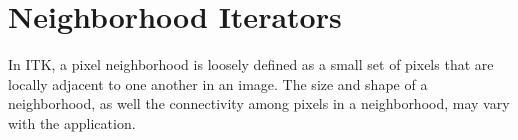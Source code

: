 
%



\section{Neighborhood Iterators}
\label{sec:NeighborhoodIterators}
In ITK, a pixel neighborhood is loosely defined as a small set of pixels that
are locally adjacent to one another in an image.  The size and shape
of a neighborhood, as well the connectivity among pixels in a neighborhood,
may vary with the application.


